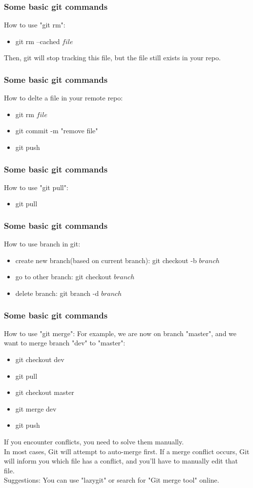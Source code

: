 \documentclass[aspectratio=169]{beamer}
\begin{document}
\begin{frame}
  \frametitle{Some basic git commands}
  How to use "git rm":
  \begin{itemize}
    \item git rm --cached $file$
  \end{itemize}
  Then, git will stop tracking this file, but the file still exists in your repo.
\end{frame}

\begin{frame}
  \frametitle{Some basic git commands}
  How to delte a file in your remote repo:
  \begin{itemize}
    \item git rm $file$
    \item git commit -m "remove file"
    \item git push
  \end{itemize}
\end{frame}

\begin{frame}
  \frametitle{Some basic git commands}
  How to use "git pull":
  \begin{itemize}
    \item git pull
  \end{itemize}
\end{frame}

\begin{frame}
  \frametitle{Some basic git commands}
  How to use branch in git:
  \begin{itemize}
    \item create new branch(based on current branch): git checkout -b $branch$
    \item go to other branch: git checkout $branch$
    \item delete branch: git branch -d $branch$
  \end{itemize}
\end{frame}

\begin{frame}
  \frametitle{Some basic git commands}
  How to use "git merge":
  For example, we are now on branch "master", and we want to merge branch "dev" to "master":
  \begin{itemize}
    \item git checkout dev
    \item git pull
    \item git checkout master
    \item git merge dev
    \item git push
  \end{itemize}
  If you encounter conflicts, you need to solve them manually. \\
  In most cases, Git will attempt to auto-merge first. If a merge conflict occurs, Git will inform you which file has a conflict, and you'll have to manually edit that file.\\
  Suggestions: You can use "lazygit" or search for "Git merge tool" online.
\end{frame}
\end{document}
